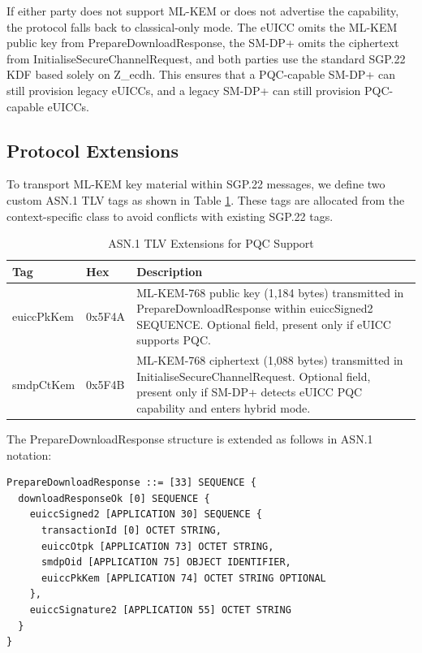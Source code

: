 \documentclass{easychair}
\begin{document}
If either party does not support ML-KEM or does not advertise the capability, the protocol falls back to classical-only mode. The eUICC omits the ML-KEM public key from PrepareDownloadResponse, the SM-DP+ omits the ciphertext from InitialiseSecureChannelRequest, and both parties use the standard SGP.22 KDF based solely on Z\_ecdh. This ensures that a PQC-capable SM-DP+ can still provision legacy eUICCs, and a legacy SM-DP+ can still provision PQC-capable eUICCs.

\subsection{Protocol Extensions}

To transport ML-KEM key material within SGP.22 messages, we define two custom ASN.1 TLV tags as shown in Table \ref{tab:asn1-extensions}. These tags are allocated from the context-specific class to avoid conflicts with existing SGP.22 tags.

\begin{table}[h]
\centering
\caption{ASN.1 TLV Extensions for PQC Support}
\label{tab:asn1-extensions}
\begin{tabular}{@{}llp{6cm}@{}}
\toprule
\textbf{Tag} & \textbf{Hex} & \textbf{Description} \\
\midrule
euiccPkKem & 0x5F4A & ML-KEM-768 public key (1,184 bytes) transmitted in PrepareDownloadResponse within euiccSigned2 SEQUENCE. Optional field, present only if eUICC supports PQC. \\
\midrule
smdpCtKem & 0x5F4B & ML-KEM-768 ciphertext (1,088 bytes) transmitted in InitialiseSecureChannelRequest. Optional field, present only if SM-DP+ detects eUICC PQC capability and enters hybrid mode. \\
\bottomrule
\end{tabular}
\end{table}

The PrepareDownloadResponse structure is extended as follows in ASN.1 notation:

\begin{verbatim}
PrepareDownloadResponse ::= [33] SEQUENCE {
  downloadResponseOk [0] SEQUENCE {
    euiccSigned2 [APPLICATION 30] SEQUENCE {
      transactionId [0] OCTET STRING,
      euiccOtpk [APPLICATION 73] OCTET STRING,
      smdpOid [APPLICATION 75] OBJECT IDENTIFIER,
      euiccPkKem [APPLICATION 74] OCTET STRING OPTIONAL
    },
    euiccSignature2 [APPLICATION 55] OCTET STRING
  }
}
\end{verbatim}
\end{document}
